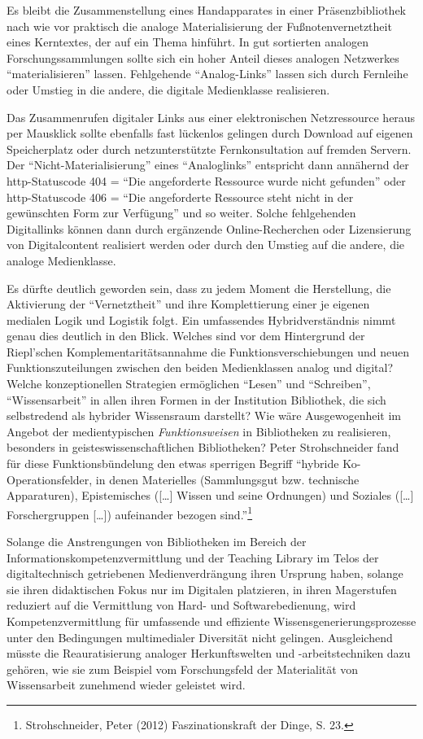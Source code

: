 \documentclass[a4paper,
fontsize=11pt,
oneside,
numbers=noperiodatend,
parskip=half-,
bibliography=totoc,
final
]{scrartcl}
\begin{document}
Es bleibt die Zusammenstellung eines Handapparates in einer
Präsenzbibliothek nach wie vor praktisch die analoge Materialisierung
der Fußnotenvernetztheit eines Kerntextes, der auf ein Thema hinführt.
In gut sortierten analogen Forschungssammlungen sollte sich ein hoher
Anteil dieses analogen Netzwerkes \enquote{materialisieren} lassen.
Fehlgehende \enquote{Analog-Links} lassen sich durch Fernleihe oder
Umstieg in die andere, die digitale Medienklasse realisieren.

Das Zusammenrufen digitaler Links aus einer elektronischen Netzressource
heraus per Mausklick sollte ebenfalls fast lückenlos gelingen durch
Download auf eigenen Speicherplatz oder durch netzunterstützte
Fernkonsultation auf fremden Servern. Der
\enquote{Nicht-Materialisierung} eines \enquote{Analoglinks} entspricht
dann annähernd der http-Statuscode 404 = \enquote{Die angeforderte
Ressource wurde nicht gefunden} oder http-Statuscode 406 = \enquote{Die
angeforderte Ressource steht nicht in der gewünschten Form zur
Verfügung} und so weiter. Solche fehlgehenden Digitallinks können dann
durch ergänzende Online-Recherchen oder Lizensierung von Digitalcontent
realisiert werden oder durch den Umstieg auf die andere, die analoge
Medienklasse.

Es dürfte deutlich geworden sein, dass zu jedem Moment die Herstellung,
die Aktivierung der \enquote{Vernetztheit} und ihre Komplettierung einer
je eigenen medialen Logik und Logistik folgt. Ein umfassendes
Hybridverständnis nimmt genau dies deutlich in den Blick. Welches sind
vor dem Hintergrund der Riepl'schen Komplementaritätsannahme die
Funktionsverschiebungen und neuen Funktionszuteilungen zwischen den
beiden Medienklassen analog und digital? Welche konzeptionellen
Strategien ermöglichen \enquote{Lesen} und \enquote{Schreiben},
\enquote{Wissensarbeit} in allen ihren Formen in der Institution
Bibliothek, die sich selbstredend als hybrider Wissensraum darstellt?
Wie wäre Ausgewogenheit im Angebot der medientypischen
\emph{Funktionsweisen} in Bibliotheken zu realisieren, besonders in
geisteswissenschaftlichen Bibliotheken? Peter Strohschneider fand für
diese Funktionsbündelung den etwas sperrigen Begriff \enquote{hybride
Ko-Operationsfelder, in denen Materielles (Sammlungsgut bzw. technische
Apparaturen), Epistemisches ({[}\ldots{}{]} Wissen und seine Ordnungen)
und Soziales ({[}\ldots{}{]} Forschergruppen {[}\ldots{}{]}) aufeinander
bezogen sind.}\footnote{Strohschneider, Peter (2012) Faszinationskraft
  der Dinge, S. 23.}

Solange die Anstrengungen von Bibliotheken im Bereich der
Informationskompetenzvermittlung und der Teaching Library im Telos der
digitaltechnisch getriebenen Medienverdrängung ihren Ursprung haben,
solange sie ihren didaktischen Fokus nur im Digitalen platzieren, in
ihren Magerstufen reduziert auf die Vermittlung von Hard- und
Softwarebedienung, wird Kompetenzvermittlung für umfassende und
effiziente Wissensgenerierungsprozesse unter den Bedingungen
multimedialer Diversität nicht gelingen. Ausgleichend müsste die
Reauratisierung analoger Herkunftswelten und -arbeitstechniken dazu
gehören, wie sie zum Beispiel vom Forschungsfeld der Materialität von
Wissensarbeit zunehmend wieder geleistet wird.
\end{document}
